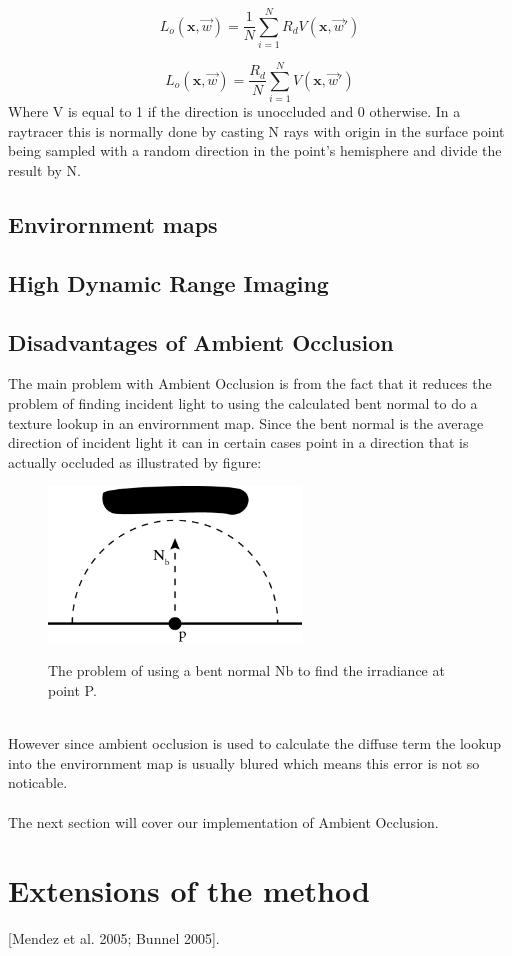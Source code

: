 \[ 
L_o(\textbf{x},\overrightarrow{w}) = 
\frac{1}{N}
\sum_{i=1}^N
R_d V(\textbf{x},\overrightarrow{w}')
\]

\[ 
L_o(\textbf{x},\overrightarrow{w}) = 
\frac{R_d}{N} \sum_{i=1}^N V(\textbf{x},\overrightarrow{w}')
\]
Where V is equal to 1 if the direction is unoccluded and 0 otherwise. In a raytracer this is normally done by casting N rays with origin in the surface point being sampled with a random direction in the point's hemisphere and divide the result by N.
\subsection{Envirornment maps}

\subsection{High Dynamic Range Imaging}

\subsection{Disadvantages of Ambient Occlusion}
The main problem with Ambient Occlusion is from the fact that it reduces the problem of finding incident light to using the calculated bent normal to do a texture lookup in an envirornment map. Since the bent normal is the average direction of incident light it can in certain cases point in a direction that is actually occluded as illustrated by figure:
\\
\begin{figure}[h]
	\centering
	\includegraphics[width=0.6\textwidth]{Theory/bentNormalProblems}
	\label{fig:bent_normal}
	\caption{The problem of using a bent normal Nb to find the irradiance at point P.}
\end{figure}
\\
However since ambient occlusion is used to calculate the diffuse term the lookup into the envirornment map is usually blured which means this error is not so noticable.
\\ \\
The next section will cover our implementation of Ambient Occlusion.

\section{Extensions of the method}
[Mendez et al. 2005; Bunnel
2005].

